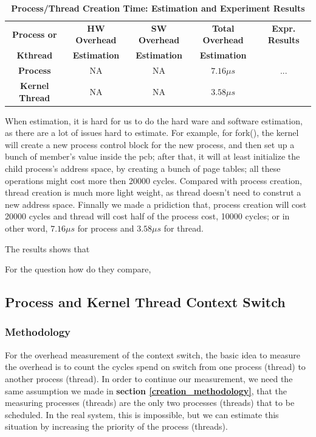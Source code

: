 \begin{table}[ht]
  \centering
  \caption{\textbf{Process/Thread Creation Time: Estimation and Experiment Results}}
  \begin{threeparttable}
  \begin{tabular}{ccccc}
  \hline
      \textbf{Process or} & \textbf{HW Overhead} & \textbf{SW Overhead } & \textbf{Total Overhead} & \textbf{Expr. Results} \\
      \textbf{Kthread} & \textbf{Estimation}       &  \textbf{Estimation}         & \textbf{Estimation}  &     \\
  \hline
    \textbf{Process} & NA & NA & $7.16 \mu s$ & ... \\
    \textbf{Kernel Thread} & NA & NA & $3.58 \mu s$ & \\
  \hline
  \end{tabular}
  \end{threeparttable}
  \label{process_creation_time}
\end{table}

When estimation, it is hard for us to do the hard ware and software estimation, as there are a lot of issues hard to estimate. For example, for fork(), the kernel will create a new process control block for the new process, and then set
up a bunch of member's value inside the pcb; after that, it will at least initialize the child process's address space, by creating a bunch of page tables; all these operations might cost more then 20000 cycles. Compared with process creation,
thread creation is much more light weight, as thread doesn't need to construt a new address space. Finnally we made a pridiction that, process creation will cost 20000 cycles and thread will cost half of the process cost, 10000 cycles; or in other
word, $7.16 \mu s$ for process and $3.58 \mu s$ for thread.

The results shows that

For the question how do they compare,


\subsection{Process and Kernel Thread Context Switch}

\subsubsection{Methodology}

For the overhead measurement of the context switch, the basic idea to measure the overhead is to count the cycles spend on switch from one process (thread) to another process (thread). In order to continue our measurement, we need the same assumption we made in
\textbf{section \ref{creation_methodology}}, that the measuring processes (threads) are the only two processes (threads) that to be scheduled. In the real system, this is impossible, but we can estimate this situation by increasing the priority of the process (threads).

